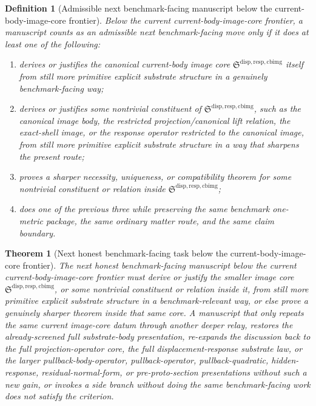 \documentclass[11pt]{article}
\newcommand{\CurrentBodyImageCore}{\mathfrak S^{\mathrm{disp,resp,cbimg}}}
\newtheorem{definition}{Definition}
\newtheorem{theorem}{Theorem}
\begin{document}
\begin{definition}[Admissible next benchmark-facing manuscript below the current-body-image-core frontier]
Below the current current-body-image-core frontier, a manuscript counts as an admissible next benchmark-facing move only if it does at least one of the following:
\begin{enumerate}
    \item derives or justifies the canonical current-body image core \(\CurrentBodyImageCore\) itself from still more primitive explicit substrate structure in a genuinely benchmark-facing way;
    \item derives or justifies some nontrivial constituent of \(\CurrentBodyImageCore\), such as the canonical image body, the restricted projection/canonical lift relation, the exact-shell image, or the response operator restricted to the canonical image, from still more primitive explicit substrate structure in a way that sharpens the present route;
    \item proves a sharper necessity, uniqueness, or compatibility theorem for some nontrivial constituent or relation inside \(\CurrentBodyImageCore\);
    \item does one of the previous three while preserving the same benchmark one-metric package, the same ordinary matter route, and the same claim boundary.
\end{enumerate}
\end{definition}

\begin{theorem}[Next honest benchmark-facing task below the current-body-image-core frontier]
The next honest benchmark-facing manuscript below the current current-body-image-core frontier must derive or justify the smaller image core \(\CurrentBodyImageCore\), or some nontrivial constituent or relation inside it, from still more primitive explicit substrate structure in a benchmark-relevant way, or else prove a genuinely sharper theorem inside that same core. A manuscript that only repeats the same current image-core datum through another deeper relay, restores the already-screened full substrate-body presentation, re-expands the discussion back to the full projection-operator core, the full displacement-response substrate law, or the larger pullback-body-operator, pullback-operator, pullback-quadratic, hidden-response, residual-normal-form, or pre-proto-section presentations without such a new gain, or invokes a side branch without doing the same benchmark-facing work does not satisfy the criterion.
\end{theorem}
\end{document}
